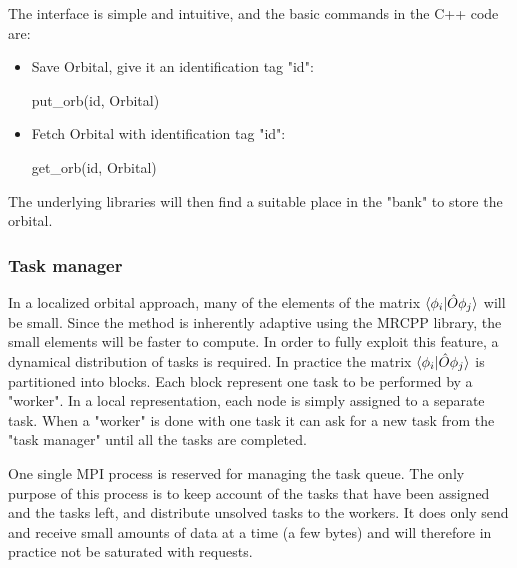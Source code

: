 \documentclass[%
 aip,
 amsmath,amssymb,
 reprint,%
]{revtex4-1}
\begin{document}
The interface is simple and intuitive, and the basic commands in the C++ code are:
\begin{itemize}
    \item Save Orbital, give it an identification tag "id": 
    
put\_orb(id, Orbital)
\item Fetch Orbital with  identification tag "id": 

get\_orb(id, Orbital)

\end{itemize}


The underlying libraries will then find a suitable place in the "bank" to store the orbital.


\subsubsection{Task manager} 
In a localized orbital approach, many of the elements of the matrix $\braket{\phi_i|{\hat O} \phi_j}$ will be small. Since the method is inherently adaptive using the MRCPP library, the small elements will be faster to compute. In order to fully exploit this feature, a dynamical distribution of tasks is required.  
In practice the matrix $\braket{\phi_i|{\hat O} \phi_j}$ is partitioned into blocks. Each block represent one task to be performed by a "worker". In a local representation, each node is simply assigned to a separate task. When a "worker" is done with one task it can ask for a new task from the "task manager" until all the tasks are completed.

One single MPI process is reserved for managing the task queue. The only purpose of this process is to keep account of the tasks that have been assigned and the tasks left, and distribute unsolved tasks to the workers. It does only send and receive small amounts of data at a time (a few bytes) and will therefore in practice not be saturated with requests.
\end{document}
